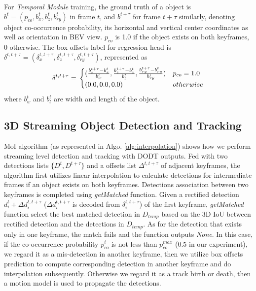 \documentclass[letterpaper, 10pt, conference]{ieeeconf}  %
\begin{document}
For \textit{Temporal Module} training, the ground truth of a object is $b^t = (p_{co}, b^t_x, b^t_z, b^t_{ry})$ in frame $t$, and $b^{t+\tau}$ for frame $t+\tau$ similarly, denoting object co-occurrence probability, its horizontal and vertical center coordinates as well as orientation in BEV view. $p_{co}$ is 1.0 if the object exists on both keyframes, 0 otherwise. The box offsets label for regression head is $\delta^{t, t+\tau} = (\delta^{t,t+\tau}_{x}, \delta^{t,t+\tau}_{z}, \delta^{t,t+\tau}_{ry})$, represented as
\begin{equation}
\delta^{t, t+\tau} = \\
\begin{cases}
(\frac{b_{x}^{t+\tau} - b_{x}^{t}}{b^t_{w}}, \frac{b_{z}^{t+\tau} - b_{z}^{t} }{b^t_{l}}, \frac{b_{ry}^{t+\tau} - b_{ry}^{t}}{b^t_{ry}}) & p_{co} = 1.0 \\
(0.0,0.0, 0.0) &  otherwise
\end{cases}
\end{equation}
where $b^t_{w}$ and $b^t_{l}$ are width and length of the object.

\subsection{3D Streaming Object Detection and Tracking} 
MoI algorithm (as represented in Algo. \ref{alg:interpolation}) shows how we perform streaming level detection and tracking with DODT outputs. Fed with two detections lists $\{D^t, D^{t+\tau}\}$ and a offsets list $\Delta^{t, t+\tau}$ of adjacent keyframes, the algorithm first utilizes linear interpolation to calculate detections for intermediate frames if an object exists on both keyframes. Detections association between two keyframes is completed using \textit{getMatched} function.  Given a rectified detection $d_i^t + \Delta d^{t, t+ \tau}_{i}$ ($\Delta d^{t, t+ \tau}_{i}$ is decoded from $\delta^{t, t+\tau}_i$) of the first keyframe, \textit{getMatched} function select the best matched detection in $D_{temp}$ based on the 3D IoU between rectified detection and the detections in $D_{temp}$.  As for the detection that exists only in one keyframe, the match fails and the function outputs \textit{None}. In this case, if the co-occurrence probability $p_{co}^i$ is not less than $p_{co}^{max}$ (0.5 in our experiment), we regard it as a mis-detection in another keyframe, then we utilize box offsets prediction to compute corresponding detection in another keyframe and do interpolation subsequently. Otherwise we regard it as a track birth or death, then a motion model is used to propagate the detections.
\end{document}
